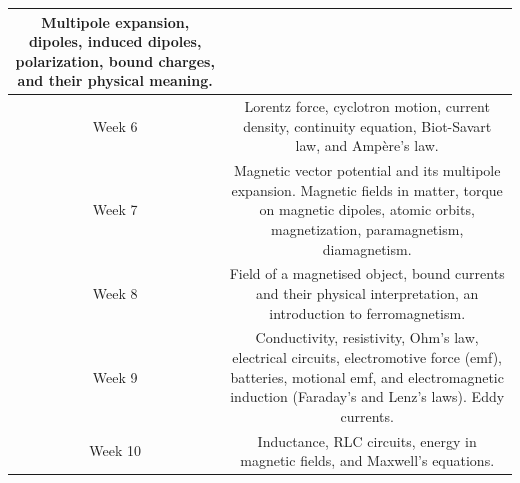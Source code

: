\documentclass[11pt]{article}
\begin{document}
\begin{table}[h!]
\begin{tabular}{ | c | c | }
\begin{minipage}{.85\textwidth}
	\vspace{1mm}
	Multipole expansion, dipoles, induced dipoles, polarization, bound charges, and their physical meaning.
	\vspace{1mm}

\end{minipage} \\
\hline
Week 6 & \begin{minipage}{.85\textwidth}

	\vspace{1mm}
	Lorentz force, cyclotron motion, current density, continuity equation, Biot-Savart law, and Ampère’s law.
	\vspace{1mm}

\end{minipage} \\
\hline
Week 7 & \begin{minipage}{.85\textwidth}

	\vspace{1mm}
	Magnetic vector potential and its multipole expansion. Magnetic fields in matter, torque on magnetic dipoles, atomic orbits, magnetization, paramagnetism, diamagnetism. 
	\vspace{1mm}

\end{minipage} \\
\hline
Week 8 & \begin{minipage}{.85\textwidth}

	\vspace{1mm}
	Field of a magnetised object, bound currents and their physical interpretation, an introduction to ferromagnetism.
	\vspace{1mm}

\end{minipage} \\
\hline
Week 9 & \begin{minipage}{.85\textwidth}

	\vspace{1mm}
	Conductivity, resistivity, Ohm’s law, electrical circuits, electromotive force (emf), batteries, motional emf, and electromagnetic induction (Faraday’s and Lenz’s laws). Eddy currents. 
	\vspace{1mm}

\end{minipage} \\
\hline
Week 10 & \begin{minipage}{.85\textwidth}

	\vspace{1mm}
	Inductance, RLC circuits, energy in magnetic fields, and Maxwell’s equations.
	\vspace{1mm}


\end{minipage}
\end{tabular}
\end{table}
\end{document}
